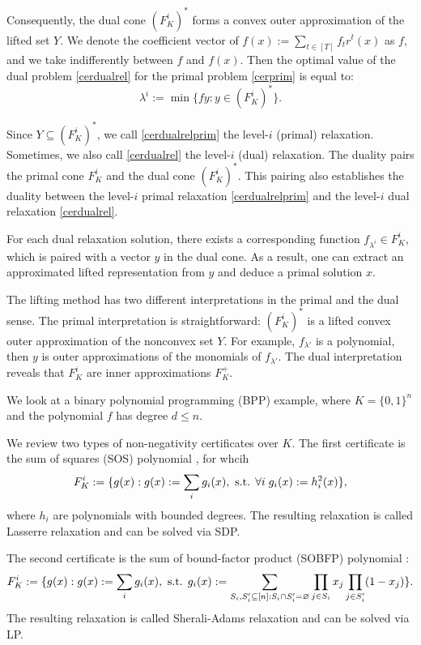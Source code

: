Consequently, the dual cone $(F^{i}_{K})^{\ast}$ forms a convex outer approximation of the lifted set $Y$. We denote the coefficient vector of $f(x) := \sum_{t \in [T]} f_t r^t(x)$ as $f$, and we take indifferently between $f$ and $f(x)$. Then the optimal value of the dual problem \eqref{cerdualrel} for the primal problem \eqref{cerprim} is equal to:
 \begin{equation}
\label{cerdualrelprim}
   \lambda^i := \min \{fy: y \in (F^{i}_{K})^{\ast}\}.
\end{equation}

 Since  $Y \subseteq (F^{i}_{K})^{\ast}$, we call \eqref{cerdualrelprim} the  level-$i$ (primal) relaxation. Sometimes, we also call \eqref{cerdualrel} the  level-$i$ (dual) relaxation.
 The duality  pairs  the primal cone $F^{i}_{K}$ and the dual cone $(F^{i}_{K})^{\ast}$. This pairing also establishes the duality between the level-$i$ primal relaxation  \eqref{cerdualrelprim} and   the level-$i$ dual relaxation  \eqref{cerdualrel}. 
 
 
For each dual relaxation solution, there exists a corresponding function $f_{\lambda^i} \in F^{i}_{K}$, which is paired with a vector $y$ in the dual cone. As a result, one can extract an approximated lifted representation from $y$ and deduce a primal solution $x$.

The lifting method has two different interpretations in the primal and the dual sense. The primal interpretation  is straightforward: $ (F^{i}_{K})^{\ast}$ is a lifted convex outer approximation of the nonconvex set $Y$. For example, $f_{\lambda'}$ is a polynomial, then $y$ is outer approximations of the monomials of  $f_{\lambda'}$. The dual interpretation reveals that $F^{i}_{K}$ are inner approximations $F^{+}_{K}$.

We look at  a binary polynomial programming (BPP) example, where $K = \{0,1\}^n$ and the polynomial $f$ has degree $d \le n$.

We review two types of non-negativity certificates over $K$. The first certificate is the sum of squares (SOS) polynomial \cite{lasserre2015introduction}, for whcih
\begin{equation}
    F^{i}_{K} := \{g(x): g(x):= \sum_{i}g_i(x), \textup{ s.t. } \forall i \; g_i(x) :=  h^2_i(x) \},
\end{equation}
where $h_i$ are polynomials with bounded degrees.
The resulting relaxation is called Lasserre relaxation and can be solved via SDP. 

The second certificate is the sum of bound-factor product (SOBFP) polynomial \cite{lasserre2002semidefinite,lasserre2015introduction}:
\begin{equation}
    F^{i}_{K} := \{g(x): g(x):= \sum_{i}g_i(x), \textup{ s.t. } g_i(x):=\sum_{S_i, S'_i \subseteq [n]: S_i \cap S'_i = \varnothing} \prod_{j \in S_i}x_j \prod_{j \in S'_i}(1-x_j) \}.
\end{equation}
The resulting relaxation is called Sherali-Adams relaxation \cite{sherali1997convex} and can be solved via LP.

